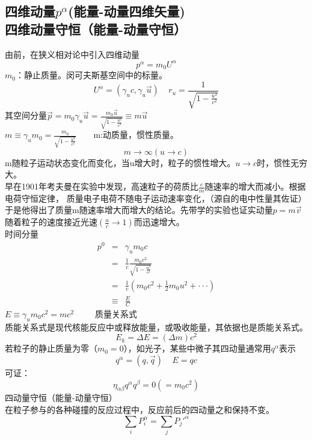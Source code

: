 \subsection{四维动量$p^{\alpha}$(能量-动量四维矢量)\\四维动量守恒（能量-动量守恒）}
由前，在狭义相对论中引入四维动量
$$p^{\alpha}=m_{0}U^{\alpha}$$
$m_{0}$：静止质量。闵可夫斯基空间中的标量。
$$U^{\alpha}=(\gamma_{u}c,\gamma_{u}\overrightarrow{u})\ \ \ \ \ r_{u}=\frac{1}{\sqrt{1-\frac{u^{2}}{c^{2}}}}$$
其空间分量$\overrightarrow{p}=m_{0}\gamma_{u}\overrightarrow{u}=\frac{m_{0}\overrightarrow{u}}{\sqrt{1-\frac{u^{2}}{c^{2}}}}\equiv m\overrightarrow{u}$\\
$m\equiv\gamma_{u}m_{0}=\frac{m_{0}}{\sqrt{1-\frac{u^{2}}{c^{2}}}}$\ \ \ \ m:动质量，惯性质量。
$$m\rightarrow\infty(u\rightarrow c)$$
m随粒子运动状态变化而变化，当u增大时，粒子的惯性增大。$u\rightarrow c$时，惯性无穷大。\\
早在1901年考夫曼在实验中发现，高速粒子的荷质比$\frac{e}{m}$随速率的增大而减小。根据电荷守恒定律， 质量电子电荷不随电子运动速率变化，（源自的电中性量其佐证）于是他得出了质量m随速率增大而增大的结论。先带学的实验也证实动量$p=m\overrightarrow{v}$随着粒子的速度接近光速$(\frac{u}{c}\rightarrow1)$而迅速增大。\\
时间分量
$$
\begin{array}{rcl}
p^{0}&=&\gamma_{u}m_{0}c\\
&=&\frac{1}{c}\frac{m_{0}c^{2}}{\sqrt{1-\frac{u^{2}}{c^{2}}}}\\
&=&\frac{1}{c}(m_{0}c^{2}+\frac{1}{2}m_{0}u^{2}+\cdot\cdot\cdot)\\
&\equiv&\frac{E}{C}
\end{array}
$$
$E\equiv\gamma_{u}m_{0}c^{2}=mc^{2}$\ \ \ \ \ 质量关系式\\
质能关系式是现代核能反应中或释放能量，或吸收能量，其依据也是质能关系式。
$$E_{k}=\Delta E=(\Delta m)c^{2}$$
若粒子的静止质量为零（$m_{0}=0$），如光子，某些中微子其四动量通常用$q^{\alpha}$表示\\
$$q^{\alpha}=(q,\overrightarrow{q})\ \ \ \ \ E=qc$$
可证：$$\eta_{\alpha\beta}q^{\alpha}q^{\beta}=0(=m_{0}c^{2})$$
四动量守恒（能量-动量守恒）\\
在粒子参与的各种碰撞的反应过程中，反应前后的四动量之和保持不变。
$$\sum_{i}P_{i}^{\alpha}=\sum_{j} P_{j}'^{\alpha}$$

